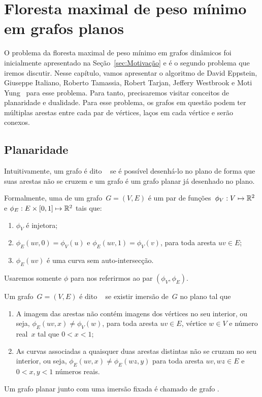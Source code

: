 \chapter{Floresta maximal de peso mínimo em grafos planos}
\label{sec:MSF}

O problema da floresta maximal de peso mínimo em grafos dinâmicos foi inicialmente apresentado na Seção~\ref{sec:Motivação} e é o segundo problema que iremos discutir.
Nesse capítulo, vamos apresentar o algoritmo de David Eppstein, Giuseppe Italiano, Roberto Tamassia, Robert Tarjan, Jeffery Westbrook e Moti Yung~\cite{EPPSTEIN-planar} para esse problema. Para tanto, precisaremos visitar conceitos de planaridade e dualidade.
Para esse problema, os grafos em questão podem ter múltiplas arestas entre cada par de vértices, laços em cada vértice e serão conexos.


\section{Planaridade}

Intuitivamente, um grafo é dito ~\cite{planarTheoryAlgorith} se é possível desenhá-lo no plano de forma que suas arestas não se cruzem e um grafo  é um grafo planar já desenhado no plano.

Formalmente, uma  de um grafo~$G=(V,E)$ é um par de funções~$\phi_V:V\mapsto \mathbb{R}^2$ e $\phi_E: E\times [0,1]\mapsto \mathbb{R}^2$ tais que:
\begin{enumerate}
\item $\phi_V$ é injetora; 
\item $\phi_E(uv,0) = \phi_V(u)$ e $\phi_E(uv,1) = \phi_V(v)$, para toda aresta $uv\in E$;
\item $\phi_E(uv)$ é uma curva sem auto-intersecção.
\end{enumerate}
Usaremos somente $\phi$ para nos referirmos ao par $(\phi_V,\phi_E)$.

Um grafo~$G=(V,E)$ é dito ~\cite{noma2003} se existir imersão de~$G$ no plano tal que
\begin{enumerate}
\item A imagem das arestas não contém imagens dos vértices no seu interior, ou seja, $\phi_E(uv,x) \neq \phi_V(w)$, para toda aresta $uv\in E$, vértice $w\in V$ e número real~$x$ tal que $0<x<1$;
\item As curvas associadas a quaisquer duas arestas distintas não se cruzam no seu interior, ou seja, $\phi_E(uv,x)\neq \phi_E(wz,y)$ para toda aresta $uv,wz\in E$ e $0<x,y<1$ números reais.
\end{enumerate}
Um grafo planar junto com uma imersão fixada é chamado de grafo .



